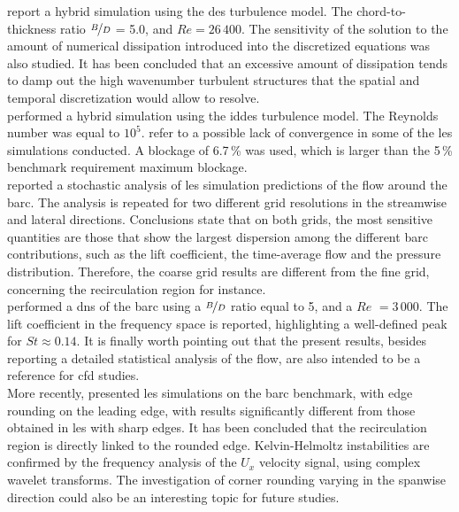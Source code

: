 \documentclass[12pt,twoside]{report}
\newcommand{\Reynolds}{$Re$ }
\begin{document}
\cite{mannini_numerical_2011} report a hybrid simulation using the \gls{des} turbulence model. The chord-to-thickness ratio $\nicefrac{B}{D}$ = 5.0, and $ Re=26\,400$. The sensitivity of the solution to the amount of numerical dissipation introduced into the discretized equations was also studied. It has been concluded that an excessive amount of dissipation tends to damp out the high wavenumber turbulent structures that the spatial and temporal discretization would allow to resolve.  \\

\cite{wei_benchmark_2011} performed a hybrid simulation using the \gls{iddes} turbulence model. The Reynolds number was equal to $10^5$. \cite{bruno_benchmark_2014} refer to a possible lack of convergence in some of the \gls{les} simulations conducted. A blockage of 6.7\,\% was used, which is larger than the 5\,\% benchmark requirement maximum blockage. \\

\cite{mariotti_stochastic_2017} reported a stochastic analysis of \gls{les} simulation predictions of the flow around the \gls{barc}. The analysis is repeated for two different grid resolutions in the streamwise and lateral directions. Conclusions state that on both grids, the most sensitive quantities are those that show the largest dispersion among the different \gls{barc} contributions, such as the lift coefficient, the time-average flow and the pressure distribution. Therefore, the coarse grid results are different from the fine grid, concerning the recirculation region for instance.  \\

\cite{cimarelli_direct_2018} performed a \gls{dns} of the \gls{barc} using a $\nicefrac{B}{D}$ ratio equal to 5, and a \Reynolds $=3\,000$. The lift coefficient in the frequency space is reported, highlighting a well-defined peak  for $St \approx 0.14$. It is finally worth pointing out that the present results, besides reporting a detailed statistical analysis of the flow, are also intended to be a reference for \gls{cfd} studies. \\

More recently, \cite{rocchio_flow_2020} presented \gls{les} simulations on the \gls{barc} benchmark, with edge rounding on the leading edge, with results significantly different from those obtained in \gls{les} with sharp edges. It has been concluded that the recirculation region is directly linked to the rounded edge. Kelvin-Helmoltz instabilities are confirmed by the frequency analysis of the $U_x$ velocity signal, using complex wavelet transforms. The investigation of corner rounding varying in the spanwise direction could also be an interesting topic for future studies.
\end{document}
